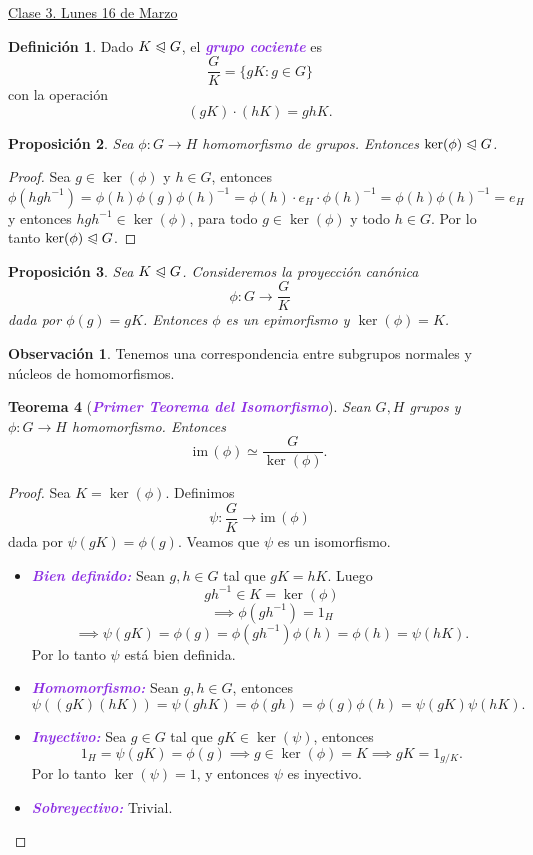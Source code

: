 \documentclass{article}
\newtheorem{theorem}{Teorema}[section]
\newtheorem{proposition}[theorem]{Proposición}
\theoremstyle{definition}
\newtheorem{definition}[theorem]{Definición}
\newtheorem*{obs}{Observación}
\theoremstyle{remark}
\numberwithin{equation}{section}
\renewcommand{\c}{\cdot}
\newcommand{\normal}{\trianglelefteqslant}
\newcommand{\im}{\mathrm{im}\,}
\newcommand{\wea}[1]{\textcolor{BlueViolet}{\textbf{\emph{#1}}}}
\newcommand{\fecha}[1]{\begin{flushright} \underline{#1} \end{flushright}}
\begin{document}
\fecha{Clase 3. Lunes 16 de Marzo}

\begin{definition}
  Dado $K \normal G$, el \wea{grupo cociente} es
  \[\frac{G}{K} = \{gK \colon g \in G\}\]
  con la operación
  \[(gK) \c (hK) = ghK.\]
\end{definition}

\begin{proposition}
  Sea $\phi \colon G \to H$ homomorfismo de grupos. Entonces $\ker(\phi) \normal G$.
\end{proposition}
\begin{proof}
  Sea $g \in \ker(\phi)$ y $h \in G$, entonces
  \[\phi(hgh^{-1}) = \phi(h) \phi(g) \phi(h)^{-1} = \phi(h) \c e_H \c \phi(h)^{-1} = \phi(h) \phi(h)^{-1} = e_H\]
  y entonces $hgh^{-1} \in \ker(\phi)$, para todo $g \in \ker(\phi)$ y todo $h \in G$. Por lo tanto $\ker(\phi) \normal G$.
\end{proof}

\begin{proposition}
  Sea $K \normal G$. Consideremos la proyección canónica $$\phi \colon G \to \frac GK$$ dada por $\phi(g) = gK$. Entonces $\phi$ es un epimorfismo y $\ker(\phi) = K$.
\end{proposition}

\begin{obs}
  Tenemos una correspondencia entre subgrupos normales y núcleos de homomorfismos. %
\end{obs}

\begin{theorem}[\wea{Primer Teorema del Isomorfismo}]
  Sean $G,H$ grupos y $\phi \colon G \to H$ homomorfismo. Entonces
  \[\im(\phi) \simeq \frac{G}{\ker(\phi)}.\]
\end{theorem}
\begin{proof}
  Sea $K = \ker(\phi)$. Definimos $$\psi \colon \frac G K \to \im(\phi)$$ dada por $\psi(gK) = \phi(g)$. Veamos que $\psi$ es un isomorfismo.
  \begin{itemize}
    \item \wea{Bien definido:} Sean $g,h \in G$ tal que $gK = hK$. Luego
    $$gh^{-1} \in K = \ker(\phi)$$
    $$\implies \phi(gh^{-1}) = 1_H$$
    $$\implies \psi(gK) = \phi(g) = \phi(gh^{-1}) \phi(h) = \phi(h) = \psi(hK).$$
    Por lo tanto $\psi$ está bien definida.
    \item \wea{Homomorfismo:} Sean $g,h \in G$, entonces
    \[\psi((gK)(hK)) = \psi(ghK) = \phi(gh) = \phi(g) \phi(h) = \psi(gK) \psi(hK).\]
    \item \wea{Inyectivo:} Sea $g \in G$ tal que $gK \in \ker(\psi)$, entonces
    \[1_H = \psi(gK) = \phi(g) \implies g \in \ker(\phi) = K \implies gK = 1_{g/K}.\]
    Por lo tanto $\ker(\psi) = 1$, y entonces $\psi$ es inyectivo.
    \item \wea{Sobreyectivo:} Trivial. %
  \end{itemize}
\end{proof}
\end{document}
